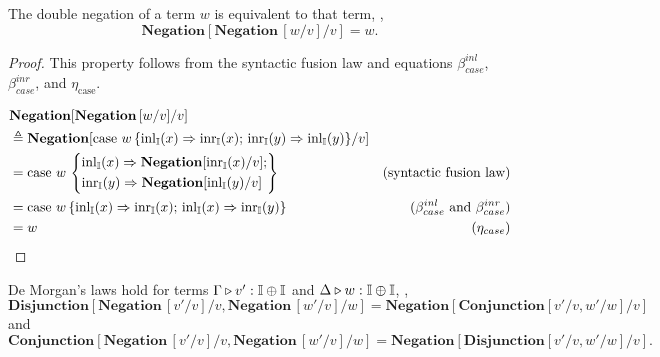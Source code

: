 \begin{lemma} \label{lem:dneg}
  The double negation of a term $w$ is equivalent to that term, \ie, 
  $$\textbf{Negation} [\textbf{Negation} \, [w/v] / v ] = w.$$
\end{lemma}

\begin{proof}

  This property follows from the syntactic fusion law and equations $\beta_{case}^{inl}$, $\beta_{case}^{inr}$, and  $\eta_{\text{case}}.$
  
    \begin{equation*}
    \begin{split}
       &\textbf{Negation} [\textbf{Negation} \, [w/v] / v ]  \\
        & \triangleq   \textbf{Negation} [ \text{case } w\,
    \{\mathrm{inl}_{\mathbb{I}}(x) 
        \Rightarrow \mathrm{inr}_{\mathbb{I}}(x) ; \,
      \mathrm{inr}_{\mathbb{I}}(y) \Rightarrow \mathrm{inl}_{\mathbb{I}}(y)
    \}/v] \\
    & = \text{case } w\,
\left\{
    \begin{aligned} 
    &\mathrm{inl}_{\mathbb{I}}(x) \Rightarrow \textbf{Negation}[\mathrm{inr}_{\mathbb{I}}(x)/v]; \\
    &\mathrm{inr}_{\mathbb{I}}(y) \Rightarrow  \textbf{Negation}[\mathrm{inl}_{\mathbb{I}}(y)/v]  \\ 
  \end{aligned}  
  \right\} & (\text{syntactic fusion law}) \\
    & =  \text{case } w\,
    \{\mathrm{inl}_{\mathbb{I}}(x) 
        \Rightarrow \mathrm{inr}_{\mathbb{I}}(x) ; \,
      \mathrm{inl}_{\mathbb{I}}(x) \Rightarrow \mathrm{inr}_{\mathbb{I}}(y)
    \} & (\beta_{case}^{inl} \text{ and }\beta_{case}^{inr}) \\
    & = w & (\eta_{case})
    \end{split} 
    \end{equation*}
\end{proof}

\begin{lemma} \label{lem:dmorgan} 
  De Morgan's laws hold for terms  $\Gamma \triangleright v': \mathbb{I} \oplus \mathbb{I}$ and $\Delta \triangleright w: \mathbb{I} \oplus \mathbb{I}$, \ie, 
  $$\textbf{Disjunction} [\textbf{Negation} \, [v'/v] / v, \textbf{Negation} \, [w'/v] / w ] =  \textbf{Negation}[\textbf{Conjunction} [v'/v, w'/w]  /v] $$ 
  and 
  $$\textbf{Conjunction} [\textbf{Negation} \, [v'/v] / v, \textbf{Negation} \, [w'/v] / w ] =  \textbf{Negation}[\textbf{Disjunction} [v'/v, w'/w]  /v].$$
\end{lemma}

